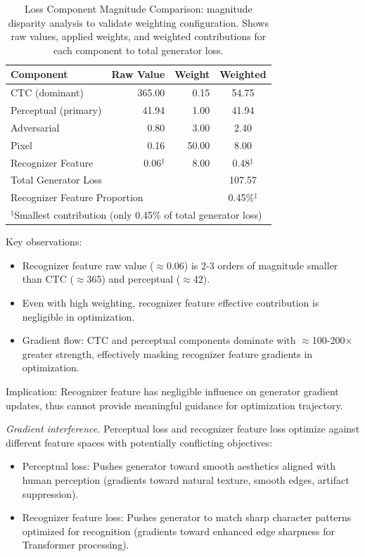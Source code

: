 \documentclass[journal]{IEEEtran}
\begin{document}
\begin{table}[!t]
\centering
\footnotesize
\caption{Loss Component Magnitude Comparison: magnitude disparity analysis to validate weighting configuration. Shows raw values, applied weights, and weighted contributions for each component to total generator loss.}
\label{table_loss_magnitude}
\begin{tabular}{lrrc}
\hline
\textbf{Component} & \textbf{Raw Value} & \textbf{Weight} & \textbf{Weighted} \\
\hline
CTC (dominant) & 365.00 & 0.15 & 54.75 \\
Perceptual (primary) & 41.94 & 1.00 & 41.94 \\
Adversarial & 0.80 & 3.00 & 2.40 \\
Pixel & 0.16 & 50.00 & 8.00 \\
Recognizer Feature & 0.06$^{\ddagger}$ & 8.00 & 0.48$^{\ddagger}$ \\
\hline
\multicolumn{3}{l}{Total Generator Loss} & 107.57 \\
\multicolumn{3}{l}{Recognizer Feature Proportion} & 0.45\%$^{\ddagger}$ \\
\multicolumn{4}{l}{\footnotesize $^{\ddagger}$Smallest contribution (only 0.45\% of total generator loss)} \\
\hline
\end{tabular}
\end{table}

Key observations:
\begin{itemize}
    \item Recognizer feature raw value ($\approx$0.06) is 2-3 orders of magnitude smaller than CTC ($\approx$365) and perceptual ($\approx$42).
    \item Even with high weighting, recognizer feature effective contribution is negligible in optimization.
    \item Gradient flow: CTC and perceptual components dominate with $\approx$100-200$\times$ greater strength, effectively masking recognizer feature gradients in optimization.
\end{itemize}

Implication: Recognizer feature has negligible influence on generator gradient updates, thus cannot provide meaningful guidance for optimization trajectory.

\textit{Gradient interference.} Perceptual loss and recognizer feature loss optimize against different feature spaces with potentially conflicting objectives:

\begin{itemize}
    \item Perceptual loss: Pushes generator toward smooth aesthetics aligned with human perception (gradients toward natural texture, smooth edges, artifact suppression).
    
    \item Recognizer feature loss: Pushes generator to match sharp character patterns optimized for recognition (gradients toward enhanced edge sharpness for Transformer processing).
\end{itemize}
\end{document}
